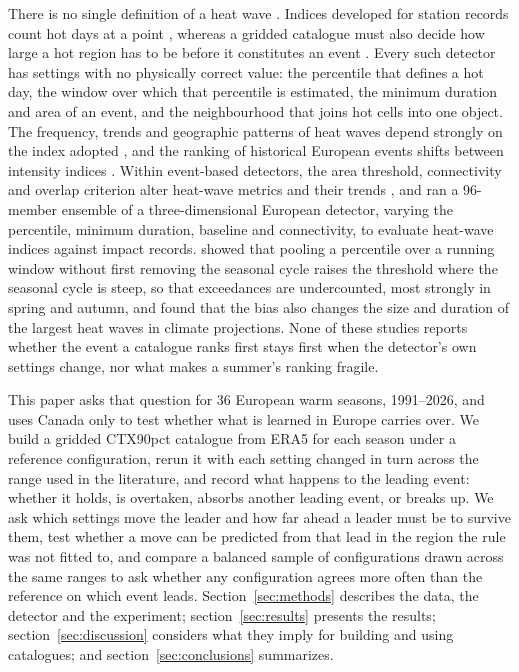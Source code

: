 \documentclass{amsdraft}
\begin{document}
There is no single definition of a heat wave
\citep{PerkinsAlexander2013,Perkins2015}. Indices developed for station
records count hot days at a point \citep{Zhang2011}, whereas a gridded
catalogue must also decide how large a hot region has to be before it
constitutes an event \citep{Stefanon2012,Lhotka2015}. Every such detector has
settings with no physically correct value: the percentile that defines a hot
day, the window over which that percentile is estimated, the minimum
duration and area of an event, and the neighbourhood that joins hot cells
into one object. The frequency, trends and geographic patterns of heat waves
depend strongly on the index adopted \citep{Smith2013}, and the ranking of
historical European events shifts between intensity indices
\citep{Becker2022}. Within event-based detectors, the area threshold,
connectivity and overlap criterion alter heat-wave metrics and their trends
\citep{Zhang2025}, and \citet{Mandonnet2026} ran a 96-member ensemble of a
three-dimensional European detector, varying the percentile, minimum
duration, baseline and connectivity, to evaluate heat-wave indices against
impact records. \citet{BrunnerVoigt2024} showed that pooling a percentile
over a running window without first removing the seasonal cycle raises the
threshold where the seasonal cycle is steep, so that exceedances are
undercounted, most strongly in spring and autumn, and
\citet{Meindl2024} found that the bias also changes the size and duration of
the largest heat waves in climate projections. None of these studies reports
whether the event a catalogue ranks first stays first when the detector's
own settings change, nor what makes a summer's ranking fragile.

This paper asks that question for 36 European warm seasons, 1991--2026,
and uses Canada only to test whether what is learned in Europe carries
over. We build a gridded CTX90pct
catalogue from ERA5 for each season under a reference configuration, rerun
it with each setting changed in turn across the range used in the
literature, and record what happens to the leading event: whether it holds,
is overtaken, absorbs another leading event, or breaks up. We ask which
settings move the leader and how far ahead a leader must be to survive them,
test whether a move can be predicted from that lead in the region the rule
was not fitted to, and compare a balanced sample of configurations drawn
across the same ranges to ask whether any configuration agrees more often
than the reference on which event leads. Section~\ref{sec:methods} describes the data, the
detector and the experiment; section~\ref{sec:results} presents the results;
section~\ref{sec:discussion} considers what they imply for building and using catalogues;
and section~\ref{sec:conclusions} summarizes.
\end{document}
